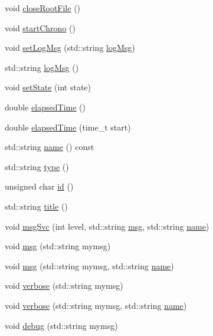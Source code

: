 \begin{DoxyCompactItemize}
void \hyperlink{classProcessus_a2f3c41e99da4c738ea3d8f7b0d20a665}{close\+Root\+File} ()
\item 
void \hyperlink{classProcessus_a5e4d34b86241fa0756e07375a14ff4b2}{start\+Chrono} ()
\item 
void \hyperlink{classProcessus_a471833f89047aa9a7ff6200a31c17a1d}{set\+Log\+Msg} (std\+::string \hyperlink{classProcessus_a42fdeb17dc13ba854222666b6aa29b61}{log\+Msg})
\item 
std\+::string \hyperlink{classProcessus_a42fdeb17dc13ba854222666b6aa29b61}{log\+Msg} ()
\item 
void \hyperlink{classProcessus_ad38cde0f1bcefa00b068e7947b8af927}{set\+State} (int state)
\item 
double \hyperlink{classProcessus_aecca96218c65bc805c988cd95447df55}{elapsed\+Time} ()
\item 
double \hyperlink{classProcessus_a06d3815ad56593dfd0d3c1f534f8b146}{elapsed\+Time} (time\+\_\+t start)
\item 
std\+::string \hyperlink{classObject_a300f4c05dd468c7bb8b3c968868443c1}{name} () const
\item 
std\+::string \hyperlink{classObject_a84f99f70f144a83e1582d1d0f84e4e62}{type} ()
\item 
unsigned char \hyperlink{classObject_af99145335cc61ff6e2798ea17db009d2}{id} ()
\item 
std\+::string \hyperlink{classObject_a73a0f1a41828fdd8303dd662446fb6c3}{title} ()
\item 
void \hyperlink{classObject_a3f9d5537ebce0c0f2bf6ae4d92426f3c}{msg\+Svc} (int level, std\+::string \hyperlink{classObject_a58b2d0618c2d08cf2383012611528d97}{msg}, std\+::string \hyperlink{classObject_a300f4c05dd468c7bb8b3c968868443c1}{name})
\item 
void \hyperlink{classObject_a58b2d0618c2d08cf2383012611528d97}{msg} (std\+::string mymsg)
\item 
void \hyperlink{classObject_ac5d59299273cee27aacf7de00d2e7034}{msg} (std\+::string mymsg, std\+::string \hyperlink{classObject_a300f4c05dd468c7bb8b3c968868443c1}{name})
\item 
void \hyperlink{classObject_a83d2db2df682907ea1115ad721c1c4a1}{verbose} (std\+::string mymsg)
\item 
void \hyperlink{classObject_a2d4120195317e2a3c6532e8bb9f3da68}{verbose} (std\+::string mymsg, std\+::string \hyperlink{classObject_a300f4c05dd468c7bb8b3c968868443c1}{name})
\item 
void \hyperlink{classObject_aac010553f022165573714b7014a15f0d}{debug} (std\+::string mymsg)

\end{DoxyCompactItemize}
